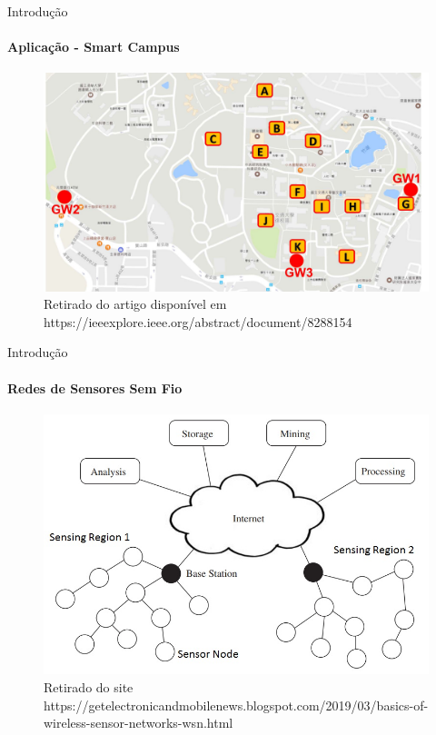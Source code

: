 \documentclass[c]{beamer}
\begin{document}
\begin{darkframes}
  \begin{frame}{Introdução}
    \framesubtitle{Aplicação - Smart Campus}
    \begin{figure}[ht]
      \centering
      \includegraphics[width=.9\textwidth]{resources/smart-campus-locations.png}\\
      \footnotesize{Retirado do artigo disponível em https://ieeexplore.ieee.org/abstract/document/8288154}
    \end{figure}
  \end{frame}

  \begin{frame}{Introdução}
    \framesubtitle{Redes de Sensores Sem Fio}
    \begin{figure}[ht]
      \centering
      \includegraphics[width=.8\textwidth]{resources/Wireless-Sensor-Networks-WSN.jpg}\\
      \footnotesize{Retirado do site https://getelectronicandmobilenews.blogspot.com/2019/03/basics-of-wireless-sensor-networks-wsn.html}
    \end{figure}
  \end{frame}



\end{darkframes}
\end{document}
